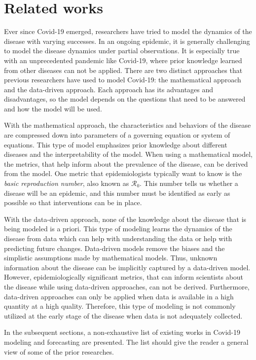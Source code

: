 \section{Related works}

Ever since Covid-19 emerged, researchers have tried to model the dynamics of the disease with varying successes.
In an ongoing epidemic, it is generally challenging to model the disease dynamics under partial observations.
It is especially true with an unprecedented pandemic like Covid-19, where prior knowledge learned from other diseases can not be applied.
There are two distinct approaches that previous researchers have used to model Covid-19: the mathematical approach and the data-driven approach.
Each approach has its advantages and disadvantages, so the model depends on the questions that need to be answered and how the model will be used.

With the mathematical approach, the characteristics and behaviors of the disease are compressed down into parameters of a governing equation or system of equations.
This type of model emphasizes prior knowledge about different diseases and the interpretability of the model.
When using a mathematical model, the metrics, that help inform about the prevalence of the disease, can be derived from the model.
One metric that epidemiologists typically want to know is the \textit{basic reproduction number}, also known as $\mathcal{R}_0$.
This number tells us whether a disease will be an epidemic, and this number must be identified as early as possible so that interventions can be in place.

With the data-driven approach, none of the knowledge about the disease that is being modeled is a priori.
This type of modeling learns the dynamics of the disease from data which can help with understanding the data or help with predicting future changes.
Data-driven models remove the biases and the simplistic assumptions made by mathematical models.
Thus, unknown information about the disease can be implicitly captured by a data-driven model.
However, epidemiologically significant metrics, that can inform scientists about the disease while using data-driven approaches, can not be derived.
Furthermore, data-driven approaches can only be applied when data is available in a high quantity at a high quality.
Therefore, this type of modeling is not commonly utilized at the early stage of the disease when data is not adequately collected.

In the subsequent sections, a non-exhaustive list of existing works in Covid-19 modeling and forecasting are presented.
The list should give the reader a general view of some of the prior researches.

